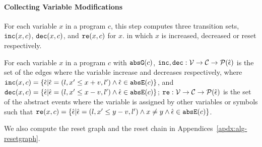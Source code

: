 \paragraph{Collecting Variable Modifications}
  For each variable $x$ in a program $c$, this step computes three transition sets, $\mathtt{inc}(x, c)$, $\mathtt{dec}(x, c)$,
  and $\mathtt{re}(x, c)$ for $x$.
  in which $x$ is increased,
  decreased
  or reset
  respectively.
  \begin{defn}
    \label{def:var_modi}
    For each variable $x$ in a program $c$ with $\mathtt{abs}{\mathtt{G}}(c)$,
    $\mathtt{inc}, \mathtt{dec} : \mathcal{V} \to \mathcal{C} \to \mathcal{P}(\hat{\mathtt{\epsilon}{}}) $
    is the set of the edges where the variable increase and decreases respectively, 
    where $\inc(x, c) = \left\{ \absevent | \absevent = (l, x' \leq x + v, l') \land \absevent \in \absE(c) \right\}$,
    and $\dec(x, c) = \left\{\absevent| \absevent = (l,  x' \leq x - v, l') \land \absevent \in \absE(c) \right\}$;
    $\mathtt{re}: \mathcal{V} \to \mathcal{C} \to \mathcal{P}(\hat{\mathtt{\epsilon}{}}) $ is the set of the abstract events where the variable is assigned by other variables or symbols such that
    $\reset(x, c) = \left\{ \absevent| \absevent = (l,  x' \leq y - v, l') \land x \neq y \land \absevent \in \absE(c) \right\}$.  
  \end{defn}
  We also compute the reset graph and the reset chain in Appendices~\ref{apdx:alg-resetgraph}. 
